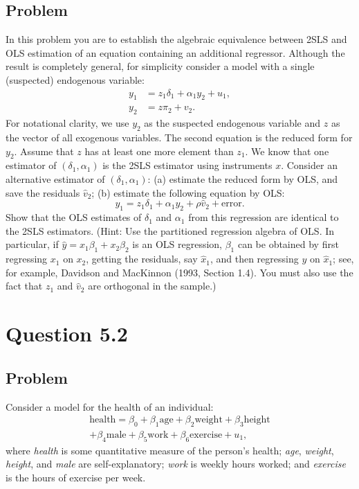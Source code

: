 \documentclass[10pt, a4paper]{article}
\begin{document}
  \subsection*{Problem}
    In this problem you are to establish the algebraic equivalence between 2SLS and OLS estimation of an equation containing an additional regressor. Although the result is completely general, for simplicity consider a model with a single (suspected) endogenous variable:
    \begin{align*}
    y_1 &= z_1\delta_1 + \alpha_1 y_2 + u_1, \\
    y_2 &= z\pi_2 + v_2.
    \end{align*}
    For notational clarity, we use $y_2$ as the suspected endogenous variable and $z$ as the vector of all exogenous variables. The second equation is the reduced form for $y_2$.
    Assume that $z$ has at least one more element than $z_1$.
    We know that one estimator of $(\delta_1, \alpha_1)$ is the 2SLS estimator using instruments $x$. Consider an alternative estimator of $(\delta_1, \alpha_1)$:
    (a) estimate the reduced form by OLS, and save the residuals $\hat{v}_2$;
    (b) estimate the following equation by OLS:
    \begin{equation}
    y_1 = z_1\delta_1 + \alpha_1 y_2 + \rho\hat{v}_2 + \text{error}. \tag{5.52}
    \end{equation}
    Show that the OLS estimates of $\delta_1$ and $\alpha_1$ from this regression are identical to the 2SLS estimators. (Hint: Use the partitioned regression algebra of OLS. In particular, if $\hat{y} = x_1\beta_1 + x_2\beta_2$ is an OLS regression, $\beta_1$ can be obtained by first regressing $x_1$ on $x_2$, getting the residuals, say $\hat{x}_1$, and then regressing $y$ on $\hat{x}_1$; see, for example, Davidson and MacKinnon (1993, Section 1.4). You must also use the fact that $z_1$ and $\hat{v}_2$ are orthogonal in the sample.)
\section*{Question 5.2}
  \subsection*{Problem}
    Consider a model for the health of an individual:
    \begin{gather}
      \text{health} = \beta_0 + \beta_1\text{age} + \beta_2\text{weight} + \beta_3\text{height} \nonumber \\
      + \beta_4\text{male} + \beta_5\text{work} + \beta_6\text{exercise} + u_1, \label{eq:health-model}
    \end{gather}
    where \textit{health} is some quantitative measure of the person's health; \textit{age}, \textit{weight}, \textit{height}, and \textit{male} are self-explanatory; \textit{work} is weekly hours worked; and \textit{exercise} is the hours of exercise per week.
\end{document}
